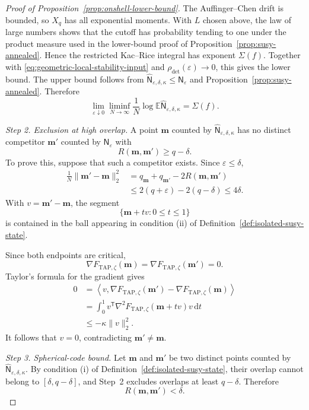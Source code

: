 \documentclass[a4paper,10pt,reqno]{amsart}
\numberwithin{equation}{section}
\newcommand{\ve}{\varepsilon}
\newcommand{\dE}{\mathbb{E}}%
\newcommand{\dd}{\mathrm{d}}
\newcommand{\TAP}{\mathrm{TAP}}
\newcommand{\bfm}{\mathbf{m}}
\begin{document}
\begin{proof}[Proof of Proposition~\ref{prop:onshell-lower-bound}]
		The Auffinger--Chen drift is bounded, so \(X_q\) has all exponential
		moments. With \(L\) chosen above,
		the law of large numbers shows that the cutoff has probability tending to
		one under the product measure used in the lower-bound proof of
		Proposition~\ref{prop:susy-annealed}. Hence the restricted
		Kac--Rice integral has exponent \(\Sigma(f)\). Together with
		\eqref{eq:geometric-local-stability-input} and
		\(\rho_{\det}(\ve)\to0\), this gives the lower bound. The upper
		bound follows from
		\(\widehat{\mathsf N}_{\ve,\delta,\kappa}\le\mathsf N_\ve\) and
		Proposition~\ref{prop:susy-annealed}. Therefore
		\begin{equation}\label{eq:geometric-truncated-first-moment}
			\lim_{\ve\downarrow0}
			\liminf_{N\to\infty}
			\frac1N
			\log
			\dE\widehat{\mathsf N}_{\ve,\delta,\kappa}
			=
			\Sigma(f).
		\end{equation}
		
		\medskip\noindent\emph{Step 2. Exclusion at high overlap.}
		A point \(\bfm\) counted by
		\(\widehat{\mathsf N}_{\ve,\delta,\kappa}\) has no distinct competitor
		\(\bfm'\) counted by \(\mathsf N_\ve\) with
		\[
		R(\bfm,\bfm')\ge q-\delta.
		\]
		To prove this, suppose that such a competitor exists. Since
		\(\ve\le\delta\),
		\[
		\begin{aligned}
			\frac1N\|\bfm'-\bfm\|_2^2
			&=
			q_\bfm+q_{\bfm'}-2R(\bfm,\bfm')\\
			&\le
			2(q+\ve)-2(q-\delta)
			\le4\delta.
		\end{aligned}
		\]
		With \(v=\bfm'-\bfm\), the segment
		\[
		\{\bfm+tv:0\le t\le1\}
		\]
		is contained in the ball appearing in condition \textup{(ii)} of
		Definition~\ref{def:isolated-susy-state}.
		
		Since both endpoints are critical,
		\[
		\nabla F_{\TAP,\zeta}(\bfm)
		=
		\nabla F_{\TAP,\zeta}(\bfm')
		=0.
		\]
		Taylor's formula for the gradient gives
		\[
		\begin{aligned}
			0
			&=
			\left\langle
			v,
			\nabla F_{\TAP,\zeta}(\bfm')
			-
			\nabla F_{\TAP,\zeta}(\bfm)
			\right\rangle\\
			&=
			\int_0^1
			v^{\mathsf T}
			\nabla^2F_{\TAP,\zeta}(\bfm+tv)
			v\,\dd t\\
			&\le
			-\kappa\|v\|_2^2.
		\end{aligned}
		\]
		It follows that \(v=0\), contradicting \(\bfm'\ne\bfm\).
		
		\medskip\noindent\emph{Step 3. Spherical-code bound.}
		Let \(\bfm\) and \(\bfm'\) be two distinct points counted by
		\(\widehat{\mathsf N}_{\ve,\delta,\kappa}\). By condition
		\textup{(i)} of Definition~\ref{def:isolated-susy-state}, their overlap
		cannot belong to
		\([\delta,q-\delta]\), and Step~2 excludes overlaps at least
		\(q-\delta\). Therefore
		\[
		R(\bfm,\bfm')<\delta.
		\]
		

\end{proof}
\end{document}
